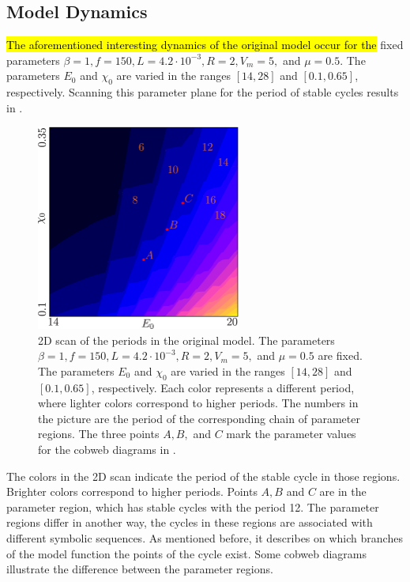 \subsection{Model Dynamics}
\label{sec:state.og.dynamics}

\hl{The aforementioned interesting dynamics of the original model occur for the} fixed parameters $\beta = 1, f = 150, L = 4.2 \cdot 10^{-3}, R = 2, V_m = 5,$ and $\mu = 0.5$.
The parameters $E_0$ and $\chi_0$ are varied in the ranges $[14, 28]$ and $[0.1, 0.65]$, respectively.
Scanning this parameter plane for the period of stable cycles results in .

\begin{figure}
	\centering
	\includegraphics[width=0.6\textwidth]{../Figures/2/2.3/result.png}
	\caption[2D scan of the periods in the original model]{
		2D scan of the periods in the original model.
		The parameters $\beta = 1, f = 150, L = 4.2 \cdot 10^{-3}, R = 2, V_m = 5,$ and $\mu = 0.5$ are fixed.
		The parameters $E_0$ and $\chi_0$ are varied in the ranges $[14, 28]$ and $[0.1, 0.65]$, respectively.
		Each color represents a different period, where lighter colors correspond to higher periods.
		The numbers in the picture are the period of the corresponding chain of parameter regions.
		The three points $A, B,$ and $C$ mark the parameter values for the cobweb diagrams in .
	}
	\label{fig:state.og.dynamics.period}
\end{figure}

The colors in the 2D scan  indicate the period of the stable cycle in those regions.
Brighter colors correspond to higher periods.
Points $A, B$ and $C$ are in the parameter region, which has stable cycles with the period 12.
The parameter regions differ in another way, the cycles in these regions are associated with different symbolic sequences.
As mentioned before, it describes on which branches of the model function the points of the cycle exist.
Some cobweb diagrams illustrate the difference between the parameter regions.

